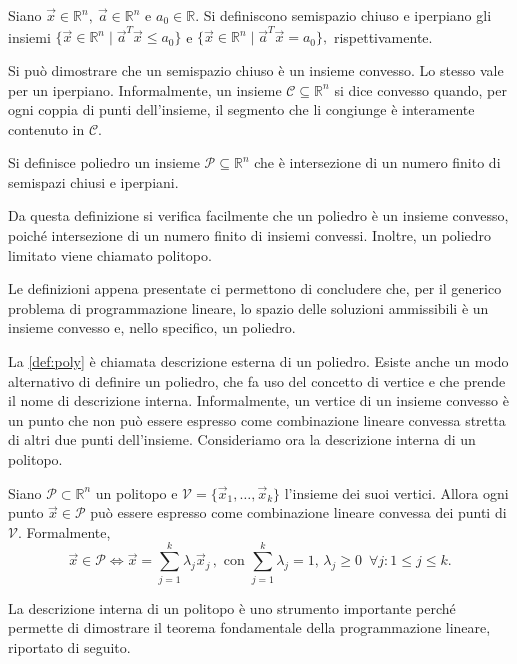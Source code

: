 \begin{definition}
    Siano $\vec{x} \in \mathbb{R}^n,\ \vec{a} \in \mathbb{R}^n$ e $a_{0}
    \in \mathbb{R}$. Si definiscono semispazio chiuso e iperpiano gli
    insiemi
    \(
        \{ \vec{x} \in \mathbb{R}^n \mid \vec{a}^T\vec{x} \le a_{0}\}
    \)
    e
    \(
        \{ \vec{x} \in \mathbb{R}^n \mid \vec{a}^T\vec{x} = a_{0}\},
    \)
    rispettivamente.
\end{definition}
Si può dimostrare che un semispazio chiuso è un insieme convesso. Lo stesso
vale per un iperpiano.  Informalmente, un insieme $\mathcal{C} \subseteq
\mathbb{R}^n$ si dice convesso quando, per ogni coppia di punti
dell'insieme, il segmento che li congiunge è interamente contenuto in
$\mathcal{C}$.
\begin{definition}\label{def:poly}
    Si definisce poliedro un insieme $\mathcal{P} \subseteq \mathbb{R}^n$
    che è intersezione di un numero finito di semispazi chiusi e iperpiani.
\end{definition}
Da questa definizione si verifica facilmente che un poliedro è un insieme
convesso, poiché intersezione di un numero finito di insiemi convessi.
Inoltre, un poliedro limitato viene chiamato politopo.

Le definizioni appena presentate ci permettono di concludere che, per il
generico problema di programmazione lineare, lo spazio delle soluzioni
ammissibili è un insieme convesso e, nello specifico, un poliedro.

La \cref{def:poly} è chiamata descrizione esterna di un poliedro. Esiste
anche un modo alternativo di definire un poliedro, che fa uso del concetto
di vertice e che prende il nome di descrizione interna. Informalmente, un
vertice di un insieme convesso è un punto che non può essere espresso come
combinazione lineare convessa stretta di altri due punti dell'insieme.
Consideriamo ora la descrizione interna di un politopo.


\begin{theorem}
    Siano $\mathcal{P} \subset \mathbb{R}^n$ un politopo e
    $\mathcal{V} = \{ \vec{x}_1, \ldots, \vec{x}_k\}$ l'insieme dei suoi
    vertici. Allora ogni punto $\vec{x} \in \mathcal{P}$ può essere
    espresso come combinazione lineare convessa dei punti di $\mathcal{V}$.
    Formalmente,
    \[
        \vec{x} \in \mathcal{P} \iff
            \vec{x} = \sum_{j=1}^{k} \lambda_j \vec{x}_j\,, \text{ con }
            \sum_{j=1}^{k} \lambda_j = 1,\,
            \lambda_j \ge 0 \,\,\, \forall j\colon 1 \le j \le k.
    \]
\end{theorem}
La descrizione interna di un politopo è uno strumento importante perché
permette di dimostrare il teorema fondamentale della programmazione
lineare, riportato di seguito.

